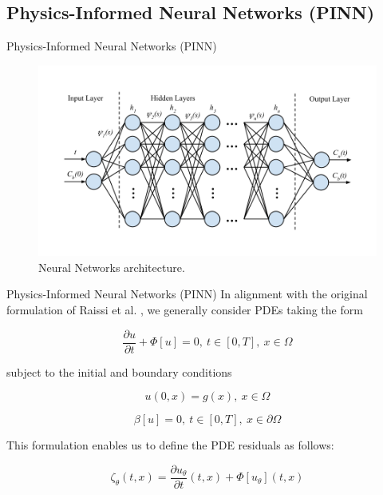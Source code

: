\documentclass[serif,8pt, aspectratio=169]{beamer}
\begin{document}
\subsection{Physics-Informed Neural Networks (PINN)}
 
\begin{frame}[fragile]{Physics-Informed Neural Networks (PINN)}
    \begin{figure}
        \centering
        \includegraphics[width=0.8\linewidth]{pic/Imune_pinn_model.png}
        \caption{Neural Networks architecture.}
        \label{fig:pinn-selection}
    \end{figure}
\end{frame}

\begin{frame}[fragile]{Physics-Informed Neural Networks (PINN)}
    In alignment with the original formulation of Raissi et al. \cite{raissi2019physics}, we generally consider PDEs taking the form
    
    \begin{equation}
        \frac{\partial u}{\partial t} + \Phi[u] = 0,~t\in [0,T],~x \in \Omega
    \end{equation}
    
    subject to the initial and boundary conditions
    
    \begin{equation}
        u(0,x)=g(x),~x\in\Omega 
    \end{equation}
    
    \begin{equation}
        \beta [u]=0,~t\in[0,T],~x\in\partial\Omega
    \end{equation}

    This formulation enables us to define the PDE residuals as follows:

    \begin{equation}
        \zeta_\theta (t,x) = \frac{\partial u_\theta}{\partial t}(t,x) + \Phi[u_\theta](t,x)
    \end{equation}

    
\end{frame}
\end{document}
